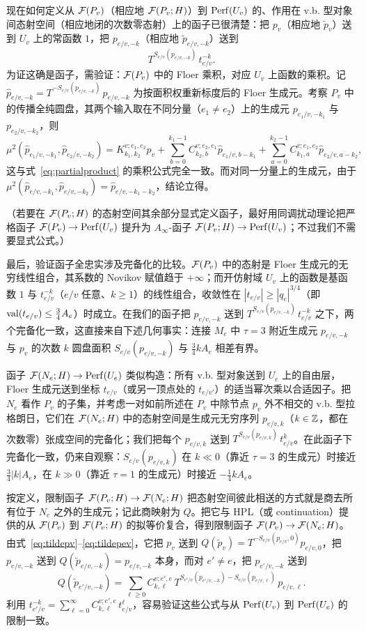现在如何定义从 $\mathcal{F}(P_v)$（相应地 $\mathcal{F}(P_v;H)$）到 $\operatorname{Perf}(U_v)$ 的、作用在 v.b. 型对象间态射空间（相应地闭的次数零态射）上的函子已很清楚：把 $p_v$（相应地 $\tilde{p}_v$）送到 $U_v$ 上的常函数 $1$，把 $p_{e/v,-k}$（相应地 $\tilde{p}_{e/v,-k}$）送到
\[
T^{S_{e/v}(p_{e/v,-k})}\, t_{e/v}^{-k}.
\]
为证这确是函子，需验证：$\mathcal{F}(P_v)$ 中的 Floer 乘积，对应 $U_v$ 上函数的乘积。记 $\hat{p}_{e/v,-k}=T^{-S_{e/v}(p_{e/v,-k})}\,p_{e/v,-k}$ 为按面积权重新标度后的 Floer 生成元。考察 $P_v$ 中的传播全纯圆盘，其两个输入取在不同分量（$e_1\neq e_2$）上的生成元 $p_{e_1/v,-k_1}$ 与 $p_{e_2/v,-k_2}$，则
\[
\mu^2(\hat{p}_{e_1/v,-k_1},\hat{p}_{e_2/v,-k_2})=K^{v;e_1,e_2}_{k_1,k_2} p_v+
\sum_{b=0}^{k_1-1}C^{v;e_2,e_1}_{k_2,b} \hat{p}_{e_1/v,b-k_1} +
\sum_{a=0}^{k_2-1}C^{v;e_1,e_2}_{k_1,a} \hat{p}_{e_2/v,a-k_2},
\]
这与式~\eqref{eq:partialproduct} 的乘积公式完全一致。而对同一分量上的生成元，由于 $\mu^2(\hat{p}_{e/v,-k_1},\hat{p}_{e/v,-k_2})=\hat{p}_{e/v,-k_1-k_2}$，结论立得。

（若要在 $\mathcal{F}(P_v;H)$ 的态射空间其余部分显式定义函子，最好用同调扰动理论把严格函子 $\mathcal{F}(P_v)\to \operatorname{Perf}(U_v)$ 提升为 $A_\infty$-函子 $\mathcal{F}(P_v;H)\to \operatorname{Perf}(U_v)$；不过我们不需要显式公式。）

最后，验证函子全忠实涉及完备化的比较。$\mathcal{F}(P_v)$ 中的态射是 Floer 生成元的无穷线性组合，其系数的 Novikov 赋值趋于 $+\infty$；而开仿射域 $U_v$ 上的函数是基函数 $1$ 与 $t_{e/v}^{-k}$（$e/v$ 任意、$k\geq 1$）的线性组合，收敛性在 $|t_{e/v}|\geq |q_e|^{3/4}$（即 $\operatorname{val}(t_{e/v})\leq \frac34 A_e$）时成立。在我们的函子把 $p_{e/v,-k}$ 送到 $T^{S_{e/v}(p_{e/v,-k})}\,t_{e/v}^{-k}$ 之下，两个完备化一致，这直接来自下述几何事实：连接 $M_e$ 中 $\tau=3$ 附近生成元 $p_{e/v,-k}$ 与 $p_v$ 的次数 $k$ 圆盘面积 $S_{e/v}(p_{e/v,-k})$ 与 $\frac34 k A_e$ 相差有界。

函子 $\mathcal{F}(N_e;H)\to \operatorname{Perf}(U_e)$ 类似构造：所有 v.b. 型对象送到 $U_e$ 上的自由层，Floer 生成元送到坐标 $t_{e/v}$（或另一顶点处的 $t_{e/v'}$）的适当幂次乘以合适因子。把 $N_e$ 看作 $P_v$ 的子集，并考虑一对如前所述在 $P_v$ 中除节点 $p_v$ 外不相交的 v.b. 型拉格朗日，它们在 $\mathcal{F}(N_e;H)$ 中的态射空间是生成元无穷序列 $p_{e/v,k}$（$k\in\mathbb{Z}$，都在次数零）张成空间的完备化；我们把每个 $p_{e/v,k}$ 送到 $T^{S_{e/v}(p_{e/v,k})}\,t_{e/v}^k$。在此函子下完备化一致，仍来自观察：$S_{e/v}(p_{e/v,k})$ 在 $k\ll 0$（靠近 $\tau=3$ 的生成元）时接近 $\frac34 |k| A_e$，在 $k\gg 0$（靠近 $\tau=1$ 的生成元）时接近 $-\frac14 k A_e$。

按定义，限制函子 $\mathcal{F}(P_v;H)\to \mathcal{F}(N_e;H)$ 把态射空间彼此相送的方式就是商去所有位于 $N_e$ 之外的生成元；记此商映射为 $Q$。把它与 HPL（或 continuation）提供的从 $\mathcal{F}(P_v)$ 到 $\mathcal{F}(P_v;H)$ 的拟等价复合，得到限制函子 $\mathcal{F}(P_v)\to \mathcal{F}(N_e;H)$。由式~\eqref{eq:tildepv}--\eqref{eq:tildepev}，它把 $p_v$ 送到 $Q(\tilde{p}_v)=T^{-S_{e/v}(p_{e/v},0)} p_{e/v,0}$，把 $p_{e/v,-k}$ 送到 $Q(\tilde{p}_{e/v,-k})=p_{e/v,-k}$ 本身，而对 $e'\neq e$，把 $p_{e'/v,-k}$ 送到
\[
Q(\tilde{p}_{e'/v,-k})=\sum_{\ell\geq 0} C^{v;e',e}_{k,\ell}\,
T^{S_{e'/v}(p_{e'/v,-k})-S_{e/v}(p_{e/v,\ell})}\,p_{e/v,\ell}.
\]
利用 $t_{e'/v}^{-k}=\sum_{\ell=0}^\infty C_{k,\ell}^{v;e',e}\, t_{e/v}^\ell$，容易验证这些公式与从 $\operatorname{Perf}(U_v)$ 到 $\operatorname{Perf}(U_e)$ 的限制一致。

